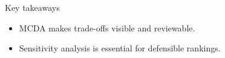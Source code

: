 \documentclass[aspectratio=169,11pt]{beamer}
\begin{document}

\begin{frame}{Key takeaways}
  \begin{itemize}
    \item MCDA makes trade-offs visible and reviewable.
    \item Sensitivity analysis is essential for defensible rankings.
  \end{itemize}
\end{frame}
\end{document}
